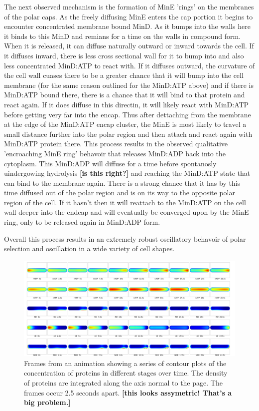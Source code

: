 \documentclass[letterpaper,twocolumn,amsmath,amssymb,pre]{revtex4-1}
\newcommand{\red}[1]{{\bf \color{red} #1}}
\newcommand{\fixme}[1]{\red{[#1]}}
\begin{document}
The next observed mechanism is the formation of MinE 'rings' on the
membranes of the polar caps.  As the freely
diffusing MinE enters the cap portion it begins to encounter
concentrated membrane bound MinD.  As it bumps into the walls here it
binds to this MinD and remians for a time on the walls in compound
form.  When it is released, it can diffuse naturally outward or inward
towards the cell.  If it diffuses inward, there is less cross
sectional wall for it to bump into and also less concentrated MinD:ATP
to react with.  If it diffuses outward, the curvature of the cell wall
cuases there to be a greater chance that it will bump into the cell
membrane (for the same reason outlined for the MinD:ATP above) and if
there is MinD:ATP bound there, there is a chance that it will bind to
that protein and react again.  If it does diffuse in this directin, it
will likely react with MinD:ATP before getting very far into the
encap.  Thus after dettaching from the membrane at the edge of the
MinD:ATP encap cluster, the MinE is most likely to travel a small
distance further into the polar region and then attach and react again
with MinD:ATP protein there.  This process results in the observed
qualitative 'encroaching MinE ring' behavoir that releases MinD:ADP
back into the cytoplasm.  This MinD:ADP will diffuse for a time before
spontanosly uindergowing hydrolysis \fixme{is this right?} and
reaching the MinD:ATP state that can bind to the membrane again.
There is a strong chance that it has by this time diffused out of the
polar region and is on its way to the opposite polar region of the
cell.  If it hasn't then it will reattach to the MinD:ATP on the cell
wall deeper into the endcap and will eventually be converged upon by
the MinE ring, only to be released again in MinD:ADP form.

Overall this process results in an extremely robust oscillatory
behavoir of polar selection and oscillation in a wide variety of cell
shapes.

\begin{figure}
  \includegraphics[width=\textwidth]{../data/shape-p/plots/image-plot--p-400-50-0-0-1500.pdf}
  \caption{Frames from an animation showing a series of contour plots
    of the concentration of proteins in different stages over time.
    The density of proteins are integrated along the axis normal to
    the page. The frames occur 2.5 seconds apart. \fixme{this looks
      assymetric! That's a big problem.}}
  \label{image-p}
\end{figure}
\end{document}
